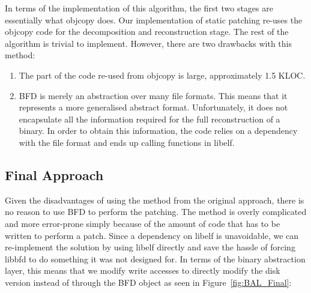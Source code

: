 In terms of the implementation of this algorithm, the first two stages are essentially what objcopy does. Our implementation of static patching re-uses the objcopy code for the decomposition and reconstruction stage. The rest of the algorithm is trivial to implement. However, there are two drawbacks with this method:

\begin{enumerate}
\item The part of the code re-used from objcopy is large, approximately 1.5 KLOC.
\item BFD is merely an abstraction over many file formats. This means that it represents a more generalised abstract format. Unfortunately, it does not encapsulate all the information required for the full reconstruction of a binary. In order to obtain this information, the code relies on a dependency with the file format and ends up calling functions in libelf.
\end{enumerate}

\subsection{Final Approach}

Given the disadvantages of using the method from the original approach, there is no reason to use BFD to perform the patching. The method is overly complicated and more error-prone simply because of the amount of code that has to be written to perform a patch. Since a dependency on libelf is unavoidable, we can re-implement the solution by using libelf directly and save the hassle of forcing libbfd to do something it was not designed for. In terms of the binary abstraction layer, this means that we modify write accesses to directly modify the disk version instead of through the BFD object as seen in Figure~\ref{fig:BAL_Final}:

